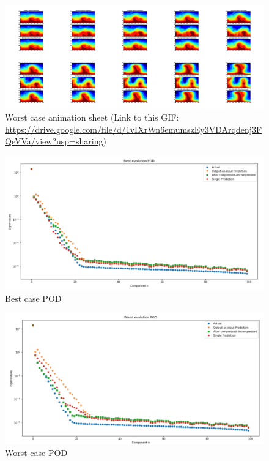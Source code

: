 \begin{figure}[H]
    \centering
    \caption{Worst case animation sheet (Link to this GIF: 
    \url{https://drive.google.com/file/d/1vIXrWn6emumszEy3VDArqdenj3FQeVVa/view?usp=sharing})}
    \includegraphics[scale=0.10]{figures/mantle_convection_images/larger_dataset_interpolated/FNN_Worst_GIF_sheet.png}
\end{figure}


\begin{figure}[H]
    \caption{Best case POD}
    \includegraphics[scale=0.5]{figures/mantle_convection_images/larger_dataset_interpolated/FNN_Best_POD.png}
\end{figure}

\begin{figure}[H]
    \caption{Worst case POD}
    \includegraphics[scale=0.5]{figures/mantle_convection_images/larger_dataset_interpolated/FNN_Worst_POD.png}
\end{figure}

